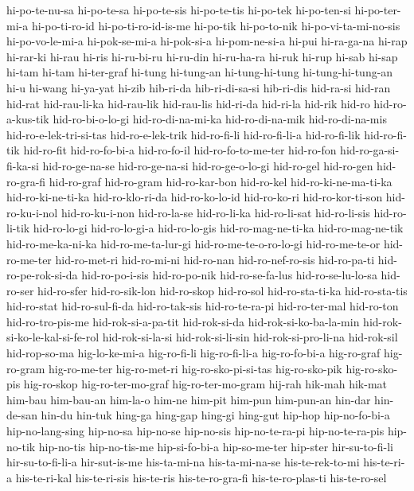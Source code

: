 {hi-po-te-nu-sa hi-po-te-sa hi-po-te-sis hi-po-te-tis hi-po-tek
hi-po-ten-si hi-po-ter-mi-a hi-po-ti-ro-id hi-po-ti-ro-id-is-me hi-po-tik
hi-po-to-nik hi-po-vi-ta-mi-no-sis hi-po-vo-le-mi-a hi-pok-se-mi-a
hi-pok-si-a hi-pom-ne-si-a hi-pui hi-ra-ga-na hi-rap hi-rar-ki hi-rau
hi-ris hi-ru-bi-ru hi-ru-din hi-ru-ha-ra hi-ruk hi-rup hi-sab hi-sap
hi-tam hi-tam hi-ter-graf hi-tung hi-tung-an hi-tung-hi-tung
hi-tung-hi-tung-an hi-u hi-wang hi-ya-yat hi-zib hib-ri-da hib-ri-di-sa-si
hib-ri-dis hid-ra-si hid-ran hid-rat hid-rau-li-ka hid-rau-lik hid-rau-lis
hid-ri-da hid-ri-la hid-rik hid-ro hid-ro-a-kus-tik hid-ro-bi-o-lo-gi
hid-ro-di-na-mi-ka hid-ro-di-na-mik hid-ro-di-na-mis
hid-ro-e-lek-tri-si-tas hid-ro-e-lek-trik hid-ro-fi-li hid-ro-fi-li-a
hid-ro-fi-lik hid-ro-fi-tik hid-ro-fit hid-ro-fo-bi-a hid-ro-fo-il
hid-ro-fo-to-me-ter hid-ro-fon hid-ro-ga-si-fi-ka-si hid-ro-ge-na-se
hid-ro-ge-na-si hid-ro-ge-o-lo-gi hid-ro-gel hid-ro-gen hid-ro-gra-fi
hid-ro-graf hid-ro-gram hid-ro-kar-bon hid-ro-kel hid-ro-ki-ne-ma-ti-ka
hid-ro-ki-ne-ti-ka hid-ro-klo-ri-da hid-ro-ko-lo-id hid-ro-ko-ri
hid-ro-kor-ti-son hid-ro-ku-i-nol hid-ro-ku-i-non hid-ro-la-se
hid-ro-li-ka hid-ro-li-sat hid-ro-li-sis hid-ro-li-tik hid-ro-lo-gi
hid-ro-lo-gi-a hid-ro-lo-gis hid-ro-mag-ne-ti-ka hid-ro-mag-ne-tik
hid-ro-me-ka-ni-ka hid-ro-me-ta-lur-gi hid-ro-me-te-o-ro-lo-gi
hid-ro-me-te-or hid-ro-me-ter hid-ro-met-ri hid-ro-mi-ni hid-ro-nan
hid-ro-nef-ro-sis hid-ro-pa-ti hid-ro-pe-rok-si-da hid-ro-po-i-sis
hid-ro-po-nik hid-ro-se-fa-lus hid-ro-se-lu-lo-sa hid-ro-ser hid-ro-sfer
hid-ro-sik-lon hid-ro-skop hid-ro-sol hid-ro-sta-ti-ka hid-ro-sta-tis
hid-ro-stat hid-ro-sul-fi-da hid-ro-tak-sis hid-ro-te-ra-pi hid-ro-ter-mal
hid-ro-ton hid-ro-tro-pis-me hid-rok-si-a-pa-tit hid-rok-si-da
hid-rok-si-ko-ba-la-min hid-rok-si-ko-le-kal-si-fe-rol hid-rok-si-la-si
hid-rok-si-li-sin hid-rok-si-pro-li-na hid-rok-sil hid-rop-so-ma
hig-lo-ke-mi-a hig-ro-fi-li hig-ro-fi-li-a hig-ro-fo-bi-a hig-ro-graf
hig-ro-gram hig-ro-me-ter hig-ro-met-ri hig-ro-sko-pi-si-tas
hig-ro-sko-pik hig-ro-sko-pis hig-ro-skop hig-ro-ter-mo-graf
hig-ro-ter-mo-gram hij-rah hik-mah hik-mat him-bau him-bau-an him-la-o
him-ne him-pit him-pun him-pun-an hin-dar hin-de-san hin-du hin-tuk
hing-ga hing-gap hing-gi hing-gut hip-hop hip-no-fo-bi-a hip-no-lang-sing
hip-no-sa hip-no-se hip-no-sis hip-no-te-ra-pi hip-no-te-ra-pis hip-no-tik
hip-no-tis hip-no-tis-me hip-si-fo-bi-a hip-so-me-ter hip-ster
hir-su-to-fi-li hir-su-to-fi-li-a hir-sut-is-me his-ta-mi-na
his-ta-mi-na-se his-te-rek-to-mi his-te-ri-a his-te-ri-kal his-te-ri-sis
his-te-ris his-te-ro-gra-fi his-te-ro-plas-ti his-te-ro-sel
}
